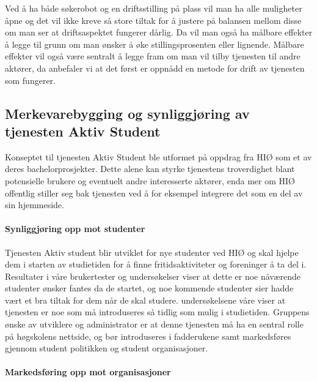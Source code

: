 Ved å ha både søkerobot og en driftsstilling på plass vil man ha alle muligheter åpne og det vil ikke kreve så store tiltak for å justere på balansen mellom disse om man ser at driftsaspektet fungerer dårlig. Da vil man også ha målbare effekter å legge til grunn om man ønsker å øke stillingsprosenten eller lignende. Målbare effekter vil også være sentralt å legge fram om man vil tilby tjenesten til andre aktører, da anbefaler vi at det først er oppnådd en metode for drift av tjenesten som fungerer.

\subsection{Merkevarebygging og synliggjøring av tjenesten Aktiv Student}
Konseptet til tjenesten Aktiv Student ble utformet på oppdrag fra HIØ som et av deres bachelorprosjekter. Dette alene kan styrke tjenestens troverdighet blant potensielle brukere og eventuelt andre interesserte aktører, enda mer om HIØ offentlig stiller seg bak tjenesten ved å for eksempel integrere det som en del av sin hjemmeside.

\paragraph{Synliggjøring opp mot studenter}

Tjenesten Aktiv student blir utviklet for nye studenter ved HIØ og skal hjelpe dem i starten av studietiden for å finne fritidsaktiviteter og foreninger å ta del i. Resultater i våre brukertester og undersøkelser viser at dette er noe nåværende studenter ønsker fantes da de startet, og noe kommende studenter sier hadde vært et bra tiltak for dem når de skal studere. 
undersøkelsene våre viser at tjenesten er noe som må introduseres så tidlig som mulig i studietiden. Gruppens ønske av utviklere og administrator er at denne tjenesten må ha en sentral rolle på høgskolens nettside, og bør introduseres i fadderukene samt markedsføres gjennom student politikken og student organisasjoner.

\paragraph{Markedsføring opp mot organisasjoner}


